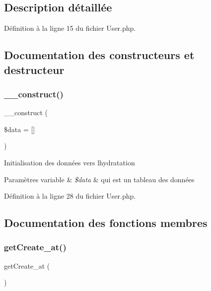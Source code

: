 \subsection{Description détaillée}


Définition à la ligne 15 du fichier User.\+php.



\subsection{Documentation des constructeurs et destructeur}
\mbox{\label{class_src_1_1_entity_1_1_user_ab3129f1d71e9f51353de9d551ea381d7}} 
\subsubsection{\texorpdfstring{\+\_\+\+\_\+construct()}{\_\_construct()}}
{\footnotesize\ttfamily \+\_\+\+\_\+construct (\begin{DoxyParamCaption}\item[{}]{\$data = {\ttfamily \mbox{[}\mbox{]}} }\end{DoxyParamCaption})}

Initialisation des données vers l\textquotesingle{}hydratation 
\begin{DoxyParams}[1]{Paramètres}
variable & {\em \$data} & qui est un tableau des données \\
\hline
\end{DoxyParams}


Définition à la ligne 28 du fichier User.\+php.



\subsection{Documentation des fonctions membres}
\mbox{\label{class_src_1_1_entity_1_1_user_ae5e6c0bedcef3f514100c20ee92c901a}} 
\subsubsection{\texorpdfstring{get\+Create\+\_\+at()}{getCreate\_at()}}
{\footnotesize\ttfamily get\+Create\+\_\+at (\begin{DoxyParamCaption}{ }\end{DoxyParamCaption})}



